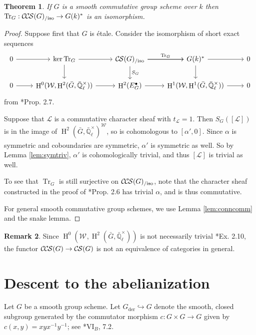 \documentclass[10pt]{amsart}
\theoremstyle{plain}
\newtheorem{theorem}{Theorem}[section]
\theoremstyle{definition}
\newtheorem{remark}[theorem]{Remark}
\newcommand{\EE}{\mathbb{\bar Q}_\ell}
\newcommand{\Fq}{k}
\newcommand{\EEx}{\EE^\times}
\newcommand{\Weil}[1]{\mathcal{W}_{#1}}
\DeclareMathOperator{\Hh}{H}
\newcommand{\der}{_{\operatorname{der}}}
\newcommand{\trFrob}[1]{t_{#1}}
\newcommand{\TrFrob}[1]{\operatorname{Tr}_{#1}}
\newcommand{\cs}[1]{{\mathcal{#1}}}
\newcommand{\CS}{{\mathcal{C\hskip-0.8pt S}}}
\newcommand{\CCS}{{\mathcal{C\hskip-.8pt C\hskip-0.8pt S}}}
\newcommand{\CSiso}[1]{\CS(#1)_{/\text{iso}}}
\newcommand{\CCSiso}[1]{\CCS(#1)_{/\text{iso}}}
\newcommand{\bG}{\bar{G}}
\begin{document}
\begin{theorem} \label{thm:trfrobiso}
If $G$ is a smooth commutative group scheme over $\Fq$ then $\TrFrob{G} : \CCSiso{G} \to G(\Fq)^*$ is an isomorphism.
\end{theorem}

\begin{proof}
Suppose first that $G$ is \'etale.  Consider the isomorphism of short exact sequences
\[
\begin{tikzcd}
 0 \arrow{r} & \ker \TrFrob{G} \arrow{d} \arrow{r} & \CSiso{G}\arrow{d}{S_G} \arrow{r}{\TrFrob{G}} \arrow{r} & G(\Fq)^* \arrow{d} \arrow{r} & 0\\
  0 \arrow{r} & \Hh^0(\Weil{},\Hh^2(\bG,\EEx)) \arrow{r} & \Hh^2(E^\bullet_G) \arrow{r} & \Hh^1(\Weil{},\Hh^1(\bG,\EEx)) \arrow{r} & 0
 \end{tikzcd}
 \]
from \cite{cunningham-roe:13a}*{Prop. 2.7}.

Suppose that $\cs{L}$ is a commutative character sheaf
with $\trFrob{\cs{L}} = 1$.  Then $S_G([\cs{L}])$ is in the image of $\Hh^2(\bG, \EEx)^\Weil{}$, so is cohomologous to
$[\alpha', 0]$.  Since $\alpha$ is symmetric and coboundaries are symmetric, $\alpha'$ is symmetric as well.
So by Lemma \ref{lem:symtriv}, $\alpha'$ is cohomologically trivial, and thus $[\cs{L}]$ is trivial as well.

To see that $\TrFrob{G}$ is still surjective on $\CCSiso{G}$, note that the character sheaf constructed in the proof of
\cite{cunningham-roe:13a}*{Prop. 2.6} has trivial $\alpha$, and is thus commutative.

For general smooth commutative group schemes, we use Lemma \ref{lem:conncomm} and the snake lemma.
\end{proof}

\begin{remark}
Since $\Hh^0(\Weil{},\Hh^2(\bG,\EEx))$ is not necessarily trivial \cite{cunningham-roe:13a}*{Ex. 2.10}, the functor
$\CCS(G) \to \CS(G)$ is not an equivalence of categories in general.
\end{remark}

\section{Descent to the abelianization}
 
Let $G$ be a smooth group scheme.
Let $G\der \hookrightarrow G$ denote the smooth, closed subgroup generated by the commutator morphism $c: G\times G \to G$ given by $c(x,y) = xyx^{-1}y^{-1}$; see \cite{SGA3}*{{VI}$_B$, 7.2}.
\end{document}
